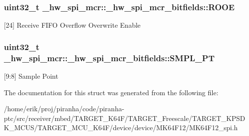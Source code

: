 \subsubsection[{\texorpdfstring{R\+O\+OE}{ROOE}}]{\setlength{\rightskip}{0pt plus 5cm}uint32\+\_\+t \+\_\+hw\+\_\+spi\+\_\+mcr\+::\+\_\+hw\+\_\+spi\+\_\+mcr\+\_\+bitfields\+::\+R\+O\+OE}\hypertarget{struct__hw__spi__mcr_1_1__hw__spi__mcr__bitfields_ab48077966cb3a40bf4b1f68873eff7d3}{}\label{struct__hw__spi__mcr_1_1__hw__spi__mcr__bitfields_ab48077966cb3a40bf4b1f68873eff7d3}
\mbox{[}24\mbox{]} Receive F\+I\+FO Overflow Overwrite Enable 
\subsubsection[{\texorpdfstring{S\+M\+P\+L\+\_\+\+PT}{SMPL_PT}}]{\setlength{\rightskip}{0pt plus 5cm}uint32\+\_\+t \+\_\+hw\+\_\+spi\+\_\+mcr\+::\+\_\+hw\+\_\+spi\+\_\+mcr\+\_\+bitfields\+::\+S\+M\+P\+L\+\_\+\+PT}\hypertarget{struct__hw__spi__mcr_1_1__hw__spi__mcr__bitfields_aebe08a335ff44f8dee8b9d204f9f2ddc}{}\label{struct__hw__spi__mcr_1_1__hw__spi__mcr__bitfields_aebe08a335ff44f8dee8b9d204f9f2ddc}
\mbox{[}9\+:8\mbox{]} Sample Point 

The documentation for this struct was generated from the following file\+:\begin{DoxyCompactItemize}
\item 
/home/erik/proj/piranha/code/piranha-\/ptc/src/receiver/mbed/\+T\+A\+R\+G\+E\+T\+\_\+\+K64\+F/\+T\+A\+R\+G\+E\+T\+\_\+\+Freescale/\+T\+A\+R\+G\+E\+T\+\_\+\+K\+P\+S\+D\+K\+\_\+\+M\+C\+U\+S/\+T\+A\+R\+G\+E\+T\+\_\+\+M\+C\+U\+\_\+\+K64\+F/device/device/\+M\+K64\+F12/M\+K64\+F12\+\_\+spi.\+h\end{DoxyCompactItemize}
